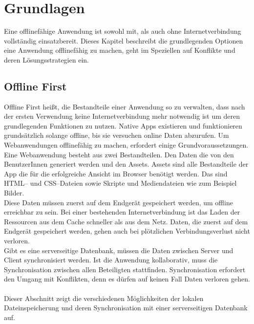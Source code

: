\chapter{\label{chap:grundlagen}Grundlagen}
Eine offlinefähige Anwendung ist sowohl mit, als auch ohne Internetverbindung vollständig einsatzbereit.
Dieses Kapitel beschreibt die grundlegenden Optionen eine Anwendung offlinefähig zu machen, geht im Speziellen auf Konflikte und deren Lösungsstrategien ein.
%
%
\section{\label{chap:offlinefirst}Offline First}
Offline First heißt, die Bestandteile einer Anwendung so zu verwalten, dass nach der ersten Verwendung keine Internetverbindung mehr notwendig ist um deren grundlegenden Funktionen zu nutzen.
Native \Glspl{App} existieren und funktionieren grundsätzlich solange offline, bis sie versuchen online Daten abzurufen. Um Webanwendungen offlinefähig zu machen, erfordert einige Grundvoraussetzungen.\\
Eine Webanwendung besteht aus zwei Bestandteilen. Den Daten die von den BenutzerInnen generiert werden und den \gls{Assets}. \gls{Assets} sind alle Bestandteile der \gls{App} die für die erfolgreiche Ansicht im Browser benötigt werden. Das sind \gls{HTML}-- und \gls{CSS}--Dateien sowie Skripte und Mediendateien wie zum Beispiel Bilder.\\
Diese Daten müssen zuerst auf dem Endgerät gespeichert werden, um offline erreichbar zu sein.
Bei einer bestehenden Internetverbindung ist das Laden der Ressourcen aus dem Cache schneller als aus dem Netz. Daten, die zuerst auf dem Endgerät gespeichert werden, gehen auch bei plötzlichen Verbindungsverlust nicht verloren.\\
Gibt es eine serverseitige Datenbank, müssen die Daten zwischen Server und Client synchronisiert werden. Ist die Anwendung kollaborativ, muss die Synchronisation zwischen allen Beteiligten stattfinden. Synchronisation erfordert den Umgang mit Konflikten, denn es dürfen auf keinen Fall Daten verloren gehen.\\\\
Dieser Abschnitt zeigt die verschiedenen Möglichkeiten der lokalen Dateinspeicherung und deren Synchronisation mit einer serverseitigen Datenbank auf.
%
%

%
%

%
